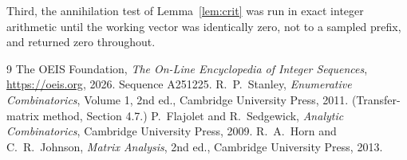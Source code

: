 \documentclass[11pt,a4paper]{article}
\theoremstyle{plain}
\theoremstyle{definition}
\begin{document}
Third, the annihilation test of Lemma~\ref{lem:crit} was run in exact integer arithmetic
until the working vector was identically zero, not to a sampled prefix, and returned zero
throughout.

\begin{thebibliography}{9}
 The OEIS Foundation, \emph{The On-Line Encyclopedia of Integer
Sequences}, \url{https://oeis.org}, 2026. Sequence A251225.
 R.~P.~Stanley, \emph{Enumerative Combinatorics}, Volume 1, 2nd ed.,
Cambridge University Press, 2011. (Transfer-matrix method, Section 4.7.)
 P.~Flajolet and R.~Sedgewick, \emph{Analytic Combinatorics}, Cambridge
University Press, 2009.
 R.~A.~Horn and C.~R.~Johnson, \emph{Matrix Analysis}, 2nd ed., Cambridge
University Press, 2013.
\end{thebibliography}
\end{document}
